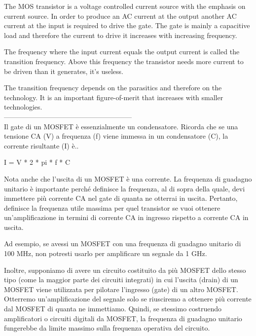 \begin{exbox}
    The MOS transistor is a voltage controlled current source with the emphasis on current source. In order to produce an AC current at the output another AC current at the input is required to drive the gate. The gate is mainly a capacitive load and therefore the current to drive it increases with increasing frequency.

The frequency where the input current equals the output current is called the transition frequency. Above this frequency the transistor needs more current to be driven than it generates, it's useless.

The transition frequency depends on the parasitics and therefore on the technology. It is an important figure-of-merit that increases with smaller technologies.
\\
--------------------------------------------------------\\
Il gate di un MOSFET è essenzialmente un condensatore. Ricorda che se una tensione CA (V) a frequenza (f) viene immessa in un condensatore (C), la corrente risultante (I) è..

I = V * 2 * pi * f * C

Nota anche che l'uscita di un MOSFET è una corrente. 
La frequenza di guadagno unitario è importante perché definisce la frequenza, al di sopra della quale, devi immettere più corrente CA nel gate di quanta ne otterrai in uscita. 
Pertanto, definisce la frequenza utile massima per quel transistor se vuoi ottenere un'amplificazione in termini di corrente CA in ingresso rispetto a corrente CA in uscita.

Ad esempio, se avessi un MOSFET con una frequenza di guadagno unitario di 100 MHz, non potresti usarlo per amplificare un segnale da 1 GHz.

Inoltre, supponiamo di avere un circuito costituito da più MOSFET dello stesso tipo (come la maggior parte dei circuiti integrati) in cui l'uscita (drain) di un MOSFET viene utilizzata per pilotare l'ingresso (gate) di un altro MOSFET. Otterremo un'amplificazione del segnale solo se riusciremo a ottenere più corrente dal MOSFET di quanta ne immettiamo. Quindi, se stessimo costruendo amplificatori o circuiti digitali da MOSFET, la frequenza di guadagno unitario fungerebbe da limite massimo sulla frequenza operativa del circuito.

\end{exbox}
%
\cleardoublepage
